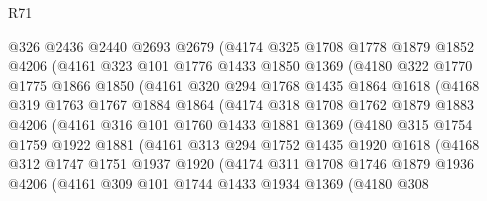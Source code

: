 \begin{lexlean}{R71}
\begin{coremodule}
            @326
            @2436
            @2440
            @2693
            @2679
            (@4174
              @325
              @1708
              @1778
              @1879
              @1852
              @4206
              (@4161
                @323
                @101
                @1776
                @1433
                @1850
                @1369
                (@4180
                  @322
                  @1770
                  @1775
                  @1866
                  @1850
                  (@4161
                    @320
                    @294
                    @1768
                    @1435
                    @1864
                    @1618
                    (@4168
                      @319
                      @1763
                      @1767
                      @1884
                      @1864
                      (@4174
                        @318
                        @1708
                        @1762
                        @1879
                        @1883
                        @4206
                        (@4161
                          @316
                          @101
                          @1760
                          @1433
                          @1881
                          @1369
                          (@4180
                            @315
                            @1754
                            @1759
                            @1922
                            @1881
                            (@4161
                              @313
                              @294
                              @1752
                              @1435
                              @1920
                              @1618
                              (@4168
                                @312
                                @1747
                                @1751
                                @1937
                                @1920
                                (@4174
                                  @311
                                  @1708
                                  @1746
                                  @1879
                                  @1936
                                  @4206
                                  (@4161
                                    @309
                                    @101
                                    @1744
                                    @1433
                                    @1934
                                    @1369
                                    (@4180
                                      @308

\end{coremodule}
\end{lexlean}
